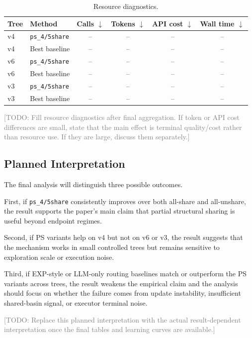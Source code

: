 \begin{table}[t]
    \centering
    \small
    \caption{Resource diagnostics.}
    \label{tab:resource_results}
    \begin{tabular}{llcccc}
        \toprule
        Tree & Method & Calls $\downarrow$ & Tokens $\downarrow$ & API cost $\downarrow$ & Wall time $\downarrow$ \\
        \midrule
        v4 & \texttt{ps\_4/5share} & -- & -- & -- & -- \\
        v4 & Best baseline & -- & -- & -- & -- \\
        v6 & \texttt{ps\_4/5share} & -- & -- & -- & -- \\
        v6 & Best baseline & -- & -- & -- & -- \\
        v3 & \texttt{ps\_4/5share} & -- & -- & -- & -- \\
        v3 & Best baseline & -- & -- & -- & -- \\
        \bottomrule
    \end{tabular}
\end{table}

\textcolor{gray}{[TODO: Fill resource diagnostics after final aggregation. If token or API cost differences are small, state that the main effect is terminal quality/cost rather than resource use. If they are large, discuss them separately.]}

\subsection{Planned Interpretation}
\label{sec:exp_planned_interpretation}

The final analysis will distinguish three possible outcomes.

First, if \texttt{ps\_4/5share} consistently improves over both all-share and all-unshare, the result supports the paper's main claim that partial structural sharing is useful beyond endpoint regimes.

Second, if PS variants help on v4 but not on v6 or v3, the result suggests that the mechanism works in small controlled trees but remains sensitive to exploration scale or execution noise.

Third, if EXP-style or LLM-only routing baselines match or outperform the PS variants across trees, the result weakens the empirical claim and the analysis should focus on whether the failure comes from update instability, insufficient shared-basin signal, or executor terminal noise.

\textcolor{gray}{[TODO: Replace this planned interpretation with the actual result-dependent interpretation once the final tables and learning curves are available.]}

